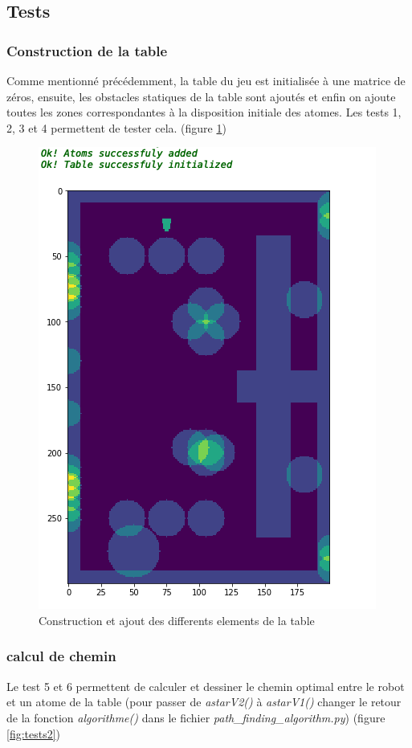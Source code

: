 \documentclass{article}
\begin{document}
\subsection{Tests}
\subsubsection{Construction de la table}
Comme mentionné précédemment, la table du jeu est initialisée à une matrice de zéros, ensuite, les obstacles statiques de la table sont ajoutés et enfin on ajoute toutes les zones correspondantes à la disposition initiale des atomes. Les tests 1, 2, 3 et 4 permettent de tester cela. (figure \ref{fig:tests1})

\begin{figure}[!h]
\centering
\includegraphics[scale=0.6]{tests1}
\caption{Construction et ajout des differents elements de la table}
\label{fig:tests1}
\end{figure}

\subsubsection{calcul de chemin}
Le test 5 et 6 permettent de calculer et dessiner le chemin optimal entre le robot et un atome de la table (pour passer de \textit{astarV2()} à \textit{astarV1()} changer le retour de la fonction \textit{algorithme()} dans le fichier \textit{path\_finding\_algorithm.py}) (figure \ref{fig:tests2})
\end{document}
